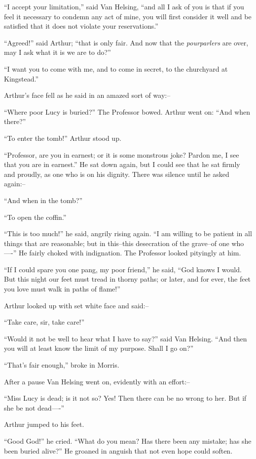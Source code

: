 \documentclass[12pt,openright]{book}
\begin{document}
“I accept your limitation,” said Van Helsing, “and all I ask of you is that if you feel it necessary to condemn any act of mine, you will first consider it well and be satisfied that it does not violate your reservations.”

“Agreed!” said Arthur; “that is only fair. And now that the \textit{pourparlers} are over, may I ask what it is we are to do?”

“I want you to come with me, and to come in secret, to the churchyard at Kingstead.”

Arthur’s face fell as he said in an amazed sort of way:–

“Where poor Lucy is buried?” The Professor bowed. Arthur went on: “And when there?”

“To enter the tomb!” Arthur stood up.

“Professor, are you in earnest; or it is some monstrous joke? Pardon me, I see that you are in earnest.” He sat down again, but I could see that he sat firmly and proudly, as one who is on his dignity. There was silence until he asked again:–

“And when in the tomb?”

“To open the coffin.”

“This is too much!” he said, angrily rising again. “I am willing to be patient in all things that are reasonable; but in this–this desecration of the grave–of one who—-” He fairly choked with indignation. The Professor looked pityingly at him.

“If I could spare you one pang, my poor friend,” he said, “God knows I would. But this night our feet must tread in thorny paths; or later, and for ever, the feet you love must walk in paths of flame!”

Arthur looked up with set white face and said:–

“Take care, sir, take care!”

“Would it not be well to hear what I have to say?” said Van Helsing. “And then you will at least know the limit of my purpose. Shall I go on?”

“That’s fair enough,” broke in Morris.

After a pause Van Helsing went on, evidently with an effort:–

“Miss Lucy is dead; is it not so? Yes! Then there can be no wrong to her. But if she be not dead—-”

Arthur jumped to his feet.

“Good God!” he cried. “What do you mean? Has there been any mistake; has she been buried alive?” He groaned in anguish that not even hope could soften.
\end{document}
